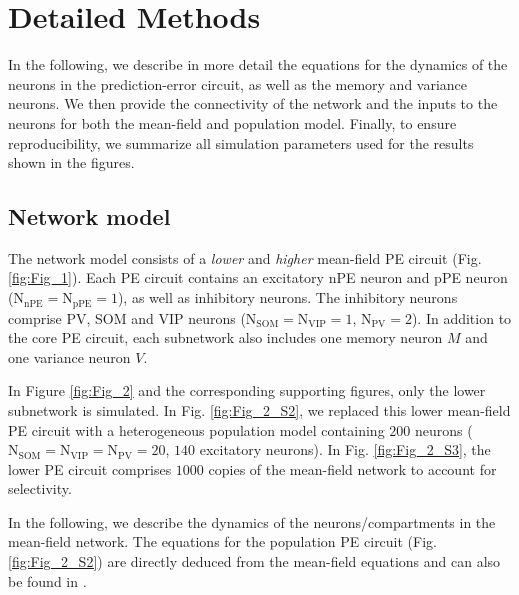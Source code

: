 \documentclass[10pt,a4paper,draft]{article}
\begin{document}
\tableofcontents
\section{Detailed Methods}
%
In the following, we describe in more detail the equations for the dynamics of the neurons in the prediction-error circuit, as well as the memory and variance neurons. We then provide the connectivity of the network and the inputs to the neurons for both the mean-field and population model. Finally, to ensure reproducibility, we summarize all simulation parameters used for the results shown in the figures.  

\subsection{Network model}
%
The network model consists of a \textit{lower} and \textit{higher} mean-field PE circuit (Fig. \ref{fig:Fig_1}). Each PE circuit contains an excitatory nPE neuron and pPE neuron ($\mathrm{N}_\mathrm{nPE} = \mathrm{N}_\mathrm{pPE} = 1$), as well as inhibitory neurons. The inhibitory neurons comprise PV, SOM and VIP neurons ($\mathrm{N}_\mathrm{SOM} = \mathrm{N}_\mathrm{VIP} = 1$, $\mathrm{N}_\mathrm{PV} = 2$). In addition to the core PE circuit, each subnetwork also includes one memory neuron $M$ and one variance neuron $V$. 

In Figure \ref{fig:Fig_2} and the corresponding supporting figures, only the lower subnetwork is simulated. In Fig. \ref{fig:Fig_2_S2}, we replaced this lower mean-field PE circuit with a heterogeneous population model containing $200$ neurons ($\mathrm{N}_\mathrm{SOM} = \mathrm{N}_\mathrm{VIP} = \mathrm{N}_\mathrm{PV} = 20$, $140$ excitatory neurons). In Fig. \ref{fig:Fig_2_S3}, the lower PE circuit comprises $1000$ copies of the mean-field network to account for selectivity.

In the following, we describe the dynamics of the neurons/compartments in the mean-field network. The equations for the population PE circuit (Fig. \ref{fig:Fig_2_S2}) are directly deduced from the mean-field equations and can also be found in \citep{hertag2022prediction}.
\end{document}
